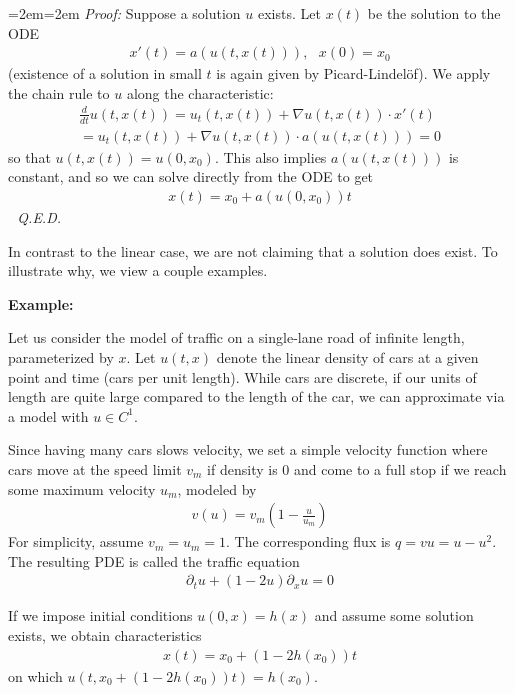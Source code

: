 \documentclass{article}
\newcommand{\pd}{\partial}
\newcounter{result}[section]
\newenvironment{pf}{%
	\par%
	\medskip
	\leftskip=2em\rightskip=2em%
	\noindent\ignorespaces \textit{Proof:} \newline}{%
	\,\, \newline \textit{Q.E.D.}\par\medskip}
\begin{document}
	\begin{pf}
		Suppose a solution $u$ exists. Let $x(t)$ be the solution to the ODE
		\begin{align*}
			x'(t) = a(u(t,x(t))), \,\,\,\, x(0) = x_0
		\end{align*}
		(existence of a solution in small $t$ is again given by Picard-Lindel{\"o}f). We apply the chain rule to $u$ along the characteristic:
		\begin{align*}
			\frac{d}{dt} u(t,x(t)) = u_{t}(t,x(t)) + \nabla u(t,x(t)) \cdot x'(t) \\
			= u_{t}(t,x(t)) + \nabla u(t,x(t)) \cdot a(u(t,x(t))) = 0
		\end{align*}
		so that $u(t,x(t)) = u(0,x_0)$. This also implies $a(u(t,x(t)))$ is constant, and so we can solve directly from the ODE to get 
		\begin{align*}
			x(t) = x_0 + a(u(0,x_0)) t
		\end{align*}
	\end{pf}
	
	In contrast to the linear case, we are not claiming that a solution does exist. To illustrate why, we view a couple examples. 
	
	
	
	\vspace{0.25 cm}
	
	\textbf{Example:}
	
	Let us consider the model of traffic on a single-lane road of infinite length, parameterized by $x$. Let $u(t,x)$ denote the linear density of cars at a given point and time (cars per unit length). While cars are discrete, if our units of length are quite large compared to the length of the car, we can approximate via a model with $u \in C^{1}$.
	
	Since having many cars slows velocity, we set a simple velocity function where cars move at the speed limit $v_m$ if density is $0$ and come to a full stop if we reach some maximum velocity $u_{m}$, modeled by 
	\begin{align*}
		v(u) = v_{m} \left(1-\frac{u}{u_m} \right) 
	\end{align*}
	For simplicity, assume $v_{m} = u_{m}=1$. The corresponding flux is $q = vu = u - u^2$. The resulting PDE is called the traffic equation
	\begin{align*}
		\pd_{t} u + (1-2u) \pd_{x}u = 0
	\end{align*}
	
	If we impose initial conditions $u(0,x) = h(x)$ and assume some solution exists, we obtain characteristics 
	\begin{align*}
		x(t) = x_0 + (1-2h(x_0))t
	\end{align*}
	on which $u(t,x_0+(1-2h(x_0))t) = h(x_0)$. 
	
\end{document}
